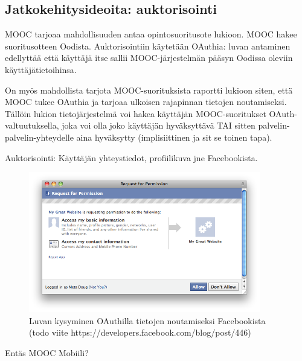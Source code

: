 \documentclass[finnish,gradu]{tktltiki}
\begin{document}

  \subsection{Jatkokehitysideoita: auktorisointi} %
  \label{sub:jatkokehitysideoita_auktorisointi}
  MOOC tarjoaa mahdollisuuden antaa opintosuoritusote lukioon. MOOC hakee suoritusotteen Oodista. Auktorisointiin käytetään OAuthia: luvan antaminen edellyttää että käyttäjä itse sallii MOOC-järjestelmän pääsyn Oodissa oleviin käyttäjätietoihinsa.

  On myös mahdollista tarjota MOOC-suorituksista raportti lukioon siten, että MOOC tukee OAuthia ja tarjoaa ulkoisen rajapinnan tietojen noutamiseksi. Tällöin lukion tietojärjestelmä voi hakea käyttäjän MOOC-suoritukset OAuth-valtuutuksella, joka voi olla joko käyttäjän hyväksyttävä TAI sitten palvelin-palvelin-yhteydelle aina hyväksytty (implisiittinen ja sit se toinen tapa).

  Auktorisointi: Käyttäjän yhteystiedot, profiilikuva jne Facebookista.

  \begin{figure}
    \centering
    \includegraphics[width=0.9\textwidth]{images/facebook_authorization_contact_info.png}
    \caption{Luvan kysyminen OAuthilla tietojen noutamiseksi Facebookista (todo viite https://developers.facebook.com/blog/post/446)}
    \label{fig:yleiskuva}
  \end{figure}




  Entäs MOOC Mobiili? %
\end{document}
